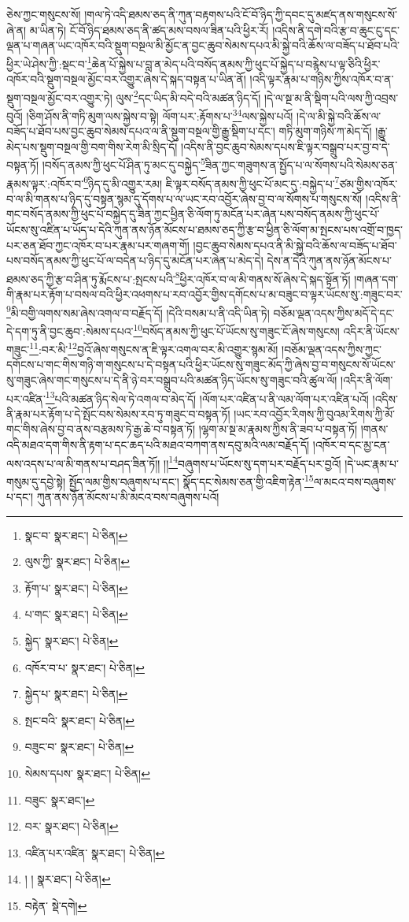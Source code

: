 ཅེས་ཀྱང་གསུངས་སོ། །གལ་ཏེ་འདི་ཐམས་ཅད་ནི་ཀུན་བརྟགས་པའི་ངོ་བོ་ཉིད་ཀྱི་དབང་དུ་མཛད་ནས་གསུངས་སོ་ཞེ་ན། མ་ཡིན་ཏེ། ངོ་བོ་ཉིད་ཐམས་ཅད་ནི་ཚད་མས་བསལ་ཟིན་པའི་ཕྱིར་རོ། །འདིས་ནི་དགེ་བའི་རྩ་བ་ཆུང་ངུ་དང་ལྡན་པ་གཞན་ཡང་འཁོར་བའི་སྡུག་བསྔལ་མི་མྱོང་ན་བྱང་ཆུབ་སེམས་དཔའ་མི་སྐྱེ་བའི་ཆོས་ལ་བཟོད་པ་ཐོབ་པའི་ཕྱིར་ཡེ་ཤེས་ཀྱི་:སྡང་བ་\footnote{སྣང་བ་  སྣར་ཐང་།  པེ་ཅིན། }ཆེན་པོ་སྐྱེས་པ་བླ་ན་མེད་པའི་བསོད་ནམས་ཀྱི་ཕུང་པོ་སྐྱེད་པ་བརྙེས་པ་ལྟ་ཅིའི་ཕྱིར་འཁོར་བའི་སྡུག་བསྔལ་མྱོང་བར་འགྱུར་ཞེས་དེ་སྐད་བསྟན་པ་ཡིན་ནོ། །འདི་ལྟར་རྣམ་པ་གཉིས་ཀྱིས་འཁོར་བ་ན་སྡུག་བསྔལ་མྱོང་བར་འགྱུར་ཏེ། ལུས་\footnote{ལུས་ཀྱི་  སྣར་ཐང་།  པེ་ཅིན། }དང་ཡིད་མི་བདེ་བའི་མཚན་ཉིད་དོ། །དེ་ལ་སྔ་མ་ནི་སྡིག་པའི་ལས་ཀྱི་འབྲས་བུའོ། །ཅིག་ཤོས་ནི་གཏི་མུག་ལས་སྐྱེས་བ་སྟེ། ལོག་པར་:རྟོགས་པ་\footnote{རྟོག་པ་  སྣར་ཐང་།  པེ་ཅིན། }\footnote{པ་གང་  སྣར་ཐང་།  པེ་ཅིན། }ལས་སྐྱེས་པའོ། །དེ་ལ་མི་སྐྱེ་བའི་ཆོས་ལ་བཟོད་པ་ཐོབ་པས་བྱང་ཆུབ་སེམས་དཔའ་ལ་ནི་སྡུག་བསྔལ་གྱི་རྒྱུ་སྡིག་པ་དང་། གཏི་མུག་གཉིས་ཀ་མེད་དོ། །རྒྱུ་མེད་པས་སྡུག་བསྔལ་གྱི་བག་གིས་རེག་མི་སྲིད་དོ། །འདིས་ནི་བྱང་ཆུབ་སེམས་དཔས་ཇི་ལྟར་བསྒྲུབ་པར་བྱ་བ་དེ་བསྟན་ཏོ། །བསོད་ནམས་ཀྱི་ཕུང་པོ་ཤིན་ཏུ་མང་དུ་བསྐྱེད་\footnote{སྐྱེད་  སྣར་ཐང་།  པེ་ཅིན། }ཟིན་ཀྱང་གཟུགས་ན་སྤྱོད་པ་ལ་སོགས་པའི་སེམས་ཅན་རྣམས་ལྟར་:འཁོར་བ་\footnote{འཁོར་བ་པ་  སྣར་ཐང་།  པེ་ཅིན། }ཉིད་དུ་མི་འགྱུར་རམ། ཇི་ལྟར་བསོད་ནམས་ཀྱི་ཕུང་པོ་མང་དུ་:བསྐྱེད་པ་\footnote{སྐྱེད་པ་  སྣར་ཐང་།  པེ་ཅིན། }ཙམ་གྱིས་འཁོར་བ་ལ་མི་གནས་པ་ཉིད་དུ་བསྟན་སྙམ་དུ་དོགས་པ་ལ་ཡང་རབ་འབྱོར་ཞེས་བྱ་བ་ལ་སོགས་པ་གསུངས་སོ། །འདིས་ནི་གང་བསོད་ནམས་ཀྱི་ཕུང་པོ་བསྐྱེད་དུ་ཟིན་ཀྱང་ཕྱིན་ཅི་ལོག་ཏུ་མངོན་པར་ཞེན་པས་བསོད་ནམས་ཀྱི་ཕུང་པོ་ཡོངས་སུ་འཛིན་པ་ཡོད་པ་དེའི་ཀུན་ནས་ཉོན་མོངས་པ་ཐམས་ཅད་ཀྱི་རྩ་བ་ཕྱིན་ཅི་ལོག་མ་སྤངས་པས་འགྲོ་བ་ཁྱད་པར་ཅན་ཐོབ་ཀྱང་འཁོར་བ་པར་རྣམ་པར་གཞག་གོ། །བྱང་ཆུབ་སེམས་དཔའ་ནི་མི་སྐྱེ་བའི་ཆོས་ལ་བཟོད་པ་ཐོབ་པས་བསོད་ནམས་ཀྱི་ཕུང་པོ་ལ་བདེན་པ་ཉིད་དུ་མངོན་པར་ཞེན་པ་མེད་དེ། དེས་ན་དེའི་ཀུན་ནས་ཉོན་མོངས་པ་ཐམས་ཅད་ཀྱི་རྩ་བ་ཤིན་ཏུ་རྨོངས་པ་:སྤངས་པའི་\footnote{སྤང་བའི་  སྣར་ཐང་།  པེ་ཅིན། }ཕྱིར་འཁོར་བ་ལ་མི་གནས་སོ་ཞེས་དེ་སྐད་སྟོན་ཏོ། །གཞན་དག་གི་རྣམ་པར་རྟོག་པ་བསལ་བའི་ཕྱིར་འཕགས་པ་རབ་འབྱོར་གྱིས་དགོངས་པ་མ་བཟུང་བ་ལྟར་ཡོངས་སུ་:གཟུང་བར་\footnote{བཟུང་བ་  སྣར་ཐང་།  པེ་ཅིན། }མི་བགྱི་ལགས་སམ་ཞེས་འགལ་བ་བརྗོད་དོ། །དེའི་བསམ་པ་ནི་འདི་ཡིན་ཏེ། བཅོམ་ལྡན་འདས་ཀྱིས་མདོ་དེ་དང་དེ་དག་ཏུ་ནི་བྱང་ཆུབ་:སེམས་དཔའ་\footnote{སེམས་དཔས་  སྣར་ཐང་།  པེ་ཅིན། }བསོད་ནམས་ཀྱི་ཕུང་པོ་ཡོངས་སུ་གཟུང་ངོ་ཞེས་གསུངས། འདིར་ནི་ཡོངས་གཟུང་\footnote{བཟུང་  སྣར་ཐང་། }:བར་མི་\footnote{བར་  སྣར་ཐང་།  པེ་ཅིན། }བྱའོ་ཞེས་གསུངས་ན་ཇི་ལྟར་འགལ་བར་མི་འགྱུར་སྙམ་མོ། །བཅོམ་ལྡན་འདས་ཀྱིས་ཀྱང་དགོངས་པ་གང་གིས་གཉི་ག་གསུངས་པ་དེ་བསྟན་པའི་ཕྱིར་ཡོངས་སུ་གཟུང་མོད་ཀྱི་ཞེས་བྱ་བ་གསུངས་སོ་ཡོངས་སུ་གཟུང་ཞེས་གང་གསུངས་པ་དེ་ནི་ཉེ་བར་བསྒྲུབ་པའི་མཚན་ཉིད་ཡོངས་སུ་གཟུང་བའི་ཚུལ་ལོ། །འདིར་ནི་ལོག་པར་འཛིན་\footnote{འཛིན་པར་འཛིན་  སྣར་ཐང་།  པེ་ཅིན། }པའི་མཚན་ཉིད་སེལ་ཏེ་འགལ་བ་མེད་དོ། །ལོག་པར་འཛིན་པ་ནི་ལམ་ལོག་པར་འཛིན་པའོ། །འདིས་ནི་རྣམ་པར་རྟོག་པ་དེ་སྤོང་བས་སེམས་རབ་ཏུ་གཟུང་བ་བསྟན་ཏོ། །ཡང་རབ་འབྱོར་རིགས་ཀྱི་བུའམ་རིགས་ཀྱི་མོ་གང་གིས་ཞེས་བྱ་བ་ནས་བརྩམས་ཏེ་རྒྱ་ཆེ་བ་བསྟན་ཏོ། །ལྷག་མ་སྔ་མ་རྣམས་ཀྱིས་ནི་ཟབ་པ་བསྟན་ཏོ། །གནས་འདི་མཐའ་དག་གིས་ནི་རྟག་པ་དང་ཆད་པའི་མཐའ་བཀག་ནས་དབུ་མའི་ལམ་བརྗོད་དོ། །འཁོར་བ་དང་མྱ་ངན་ལས་འདས་པ་ལ་མི་གནས་པ་བཤད་ཟིན་ཏོ།། །།\footnote{། །  སྣར་ཐང་།  པེ་ཅིན། }བཞུགས་པ་ཡོངས་སུ་དག་པར་བརྗོད་པར་བྱའོ། །དེ་ཡང་རྣམ་པ་གསུམ་དུ་དབྱེ་སྟེ། སྤྱོད་ལམ་གྱིས་བཞུགས་པ་དང་། སྣོད་དང་སེམས་ཅན་གྱི་འཇིག་རྟེན་\footnote{བརྟེན་  སྡེ་དགེ། }ལ་མངའ་བས་བཞུགས་པ་དང་། ཀུན་ནས་ཉོན་མོངས་པ་མི་མངའ་བས་བཞུགས་པའོ། 